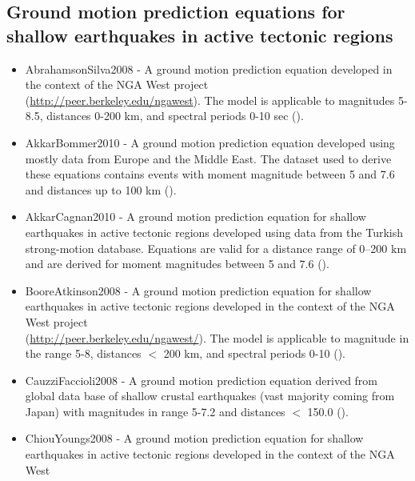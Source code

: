 \begin{itemize}
\section{Ground motion prediction equations for shallow earthquakes 
    in active tectonic regions}
\begin{itemize} 
    \item AbrahamsonSilva2008 - A ground motion prediction equation 
        developed in the context of the NGA West project \hfill \\    (\href{http://peer.berkeley.edu/ngawest/}{http://peer.berkeley.edu/ngawest}).
        The model is applicable to magnitudes 5-8.5, distances 0-200 km, and
        spectral periods 0-10 sec (\cite{abrahamson2008}).
    \item AkkarBommer2010 - A ground motion prediction equation 
        developed using mostly data from Europe and the Middle East. The dataset 
        used to derive these equations contains events with moment 
        magnitude between 5 and 7.6 and distances up to 100 km (\cite{akkar2010}).
    \item AkkarCagnan2010 - A ground motion prediction equation for shallow
        earthquakes in active tectonic regions developed using data from the 
        Turkish strong-motion database. Equations are valid for a distance 
        range of 0–200 km and are derived for moment magnitudes 
        between 5 and 7.6 (\cite{akkar2010a}).
    \item BooreAtkinson2008 - A ground motion prediction equation 
        for shallow earthquakes in active tectonic regions developed in 
        the context of the NGA West project \hfill \\
        (\href{http://peer.berkeley.edu/ngawest/}
        {http://peer.berkeley.edu/ngawest/}).
        The model is applicable to magnitude in the range 5-8, distances $<$ 200 km,
        and spectral periods 0-10 (\cite{boore2008}).
    \item CauzziFaccioli2008 - A ground motion prediction equation 
        derived from global data base of shallow crustal earthquakes (vast majority coming from Japan) with magnitudes in
        range 5-7.2 and distances $<$ 150.0 (\cite{cauzzi2008}).
    \item ChiouYoungs2008 - A ground motion prediction equation 
        for shallow earthquakes in active tectonic regions developed in 
        the context of the NGA West \hfill \\

\end{itemize}
\end{itemize}
